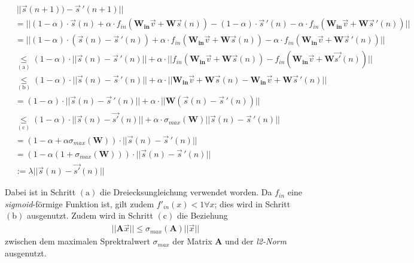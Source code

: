 \begin{align*}
&~||\vec{s}(n+1))- \vec{s}\,'(n+1)|| \\
&= ||(1 - \alpha) \cdot \vec{s}(n)  + \alpha \cdot f_{in}\left( \mathbf{W_{in}} \vec{v} + \mathbf{W} \vec{s}(n) \right) - (1 - \alpha) \cdot \vec{s}\,'(n)  - \alpha \cdot f_{in}\left( \mathbf{W_{in}} \vec{v} + \mathbf{W} \vec{s}\,'(n) \right)|| \\
&= || (1-\alpha)\cdot(\vec{s}(n)-\vec{s}\,'(n)) + \alpha \cdot f_{in}\left( \mathbf{W_{in}} \vec{v} + \mathbf{W} \vec{s}(n) \right) - \alpha \cdot f_{in}\left( \mathbf{W_{in}} \vec{v} + \mathbf{W} \vec{s}\,'(n) \right) ||\\
&\underset{\mathrm{(a)}}{\leq} (1-\alpha)\cdot|| \vec{s}(n)-\vec{s}\,'(n)|| + \alpha \cdot ||f_{in}\left( \mathbf{W_{in}} \vec{v} + \mathbf{W} \vec{s}(n) \right) - f_{in}\left( \mathbf{W_{in}} \vec{v} + \mathbf{W} \vec{s'}(n) \right) ||\\
&\underset{\mathrm{(b)}}{\leq} (1-\alpha)\cdot|| \vec{s}(n)-\vec{s}\,'(n)|| + \alpha \cdot ||\mathbf{W_{in}} \vec{v} + \mathbf{W} \vec{s}(n)- \mathbf{W_{in}} \vec{v} + \mathbf{W} \vec{s}\,'(n) ||\\
&= (1-\alpha)\cdot|| \vec{s}(n)-\vec{s}\,'(n)|| + \alpha \cdot ||\mathbf{W} \left(\vec{s}(n)- \vec{s}\,'(n) \right)||\\
&\underset{\mathrm{(c)}}{\leq} (1-\alpha)\cdot ||\vec{s}(n)-\vec{s'}(n)|| + \alpha \cdot \sigma_{max}\left(\mathbf{W}\right)||\vec{s}(n)- \vec{s}\,'(n) ||\\
&= \left(1-\alpha+\alpha\sigma_{max} \left(\mathbf{W} \right) \right) \cdot ||\vec{s}(n)-\vec{s}\,'(n)|| \\
&= \left(1-\alpha(1+\sigma_{max} \left(\mathbf{W} \right)) \right) \cdot ||\vec{s}(n)-\vec{s}\,'(n)|| \\
&:= \lambda ||\vec{s}(n)-\vec{s'}(n)||
\end{align*}

Dabei ist in Schritt $\mathrm{(a)}$ die Dreiecksungleichung verwendet worden. Da $f_{in}$ eine \textit{sigmoid}-förmige Funktion ist, gilt zudem $f'_{in}(x) < 1 \forall x$; dies wird in Schritt $\mathrm{(b)}$ ausgenutzt. Zudem wird in Schritt $\mathrm{(c)}$ die Beziehung
\begin{align*}
||\mathbf{A} \vec{x}|| \leq \sigma_{max}\left(\mathbf{A} \right) ||\vec{x}||
\end{align*}
zwischen dem maximalen Sprektralwert $\sigma_{max}$ der Matrix $\mathbf{A}$ und der \textit{l2-Norm} ausgenutzt.\\

